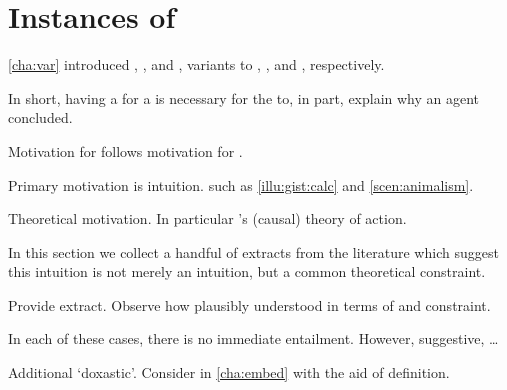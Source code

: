 \chapter{Instances of \issueConstraint{}}
\label{cha:lit}

\begin{note}
  \autoref{cha:var} introduced \qWhyV{}, \qHowV{}, and \issueConstraint{}, variants to \qWhy{}, \qHow{}, and \issueInclusion{}, respectively.

  In short, having a  for a \ros{} is necessary for the \ros{} to, in part, explain why an agent concluded.

  Motivation for \issueConstraint{} follows motivation for \issueInclusion{}.

  Primary motivation is intuition.
   such as \autoref{illu:gist:calc} and \autoref{scen:animalism}.

  Theoretical motivation.
  In particular \citeauthor{Davidson:1963aa}'s (causal) theory of action.
\end{note}

\begin{note}
  In this section we collect a handful of extracts from the literature which suggest this intuition is not merely an intuition, but a common theoretical constraint.

  Provide extract.
  Observe how plausibly understood in terms of \wit{} and constraint.

  In each of these cases, there is no immediate entailment.
  However, suggestive, \dots
\end{note}

\begin{note}
  \begin{TOCEnum}
  \item
  \item
  \item
  \item
  \item
  \end{TOCEnum}
\end{note}

\begin{note}
  Additional `doxastic'.
  Consider in \autoref{cha:embed} with the aid of definition.
\end{note}

\newpage


